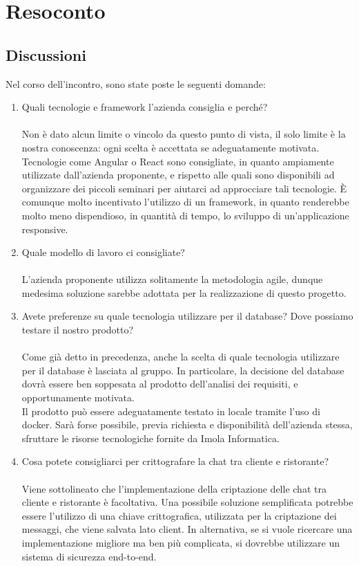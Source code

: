 \documentclass[12pt]{article}
\begin{document}
\section{Resoconto} \label{sec:resoconto}
\subsection{Discussioni} \label{subsec:resdiscussione}
Nel corso dell'incontro, sono state poste le seguenti domande:
\begin{enumerate}
    \item Quali tecnologie e framework l’azienda consiglia e perché?\\ \\
Non è dato alcun limite o vincolo da questo punto di vista, il solo limite è la nostra conoscenza: ogni scelta è accettata se adeguatamente motivata. Tecnologie come Angular o React sono consigliate, in quanto ampiamente utilizzate dall'azienda proponente, e rispetto alle quali sono disponibili ad organizzare dei piccoli seminari per aiutarci ad approcciare tali tecnologie. È comunque molto incentivato l'utilizzo di un framework, in quanto renderebbe molto meno dispendioso, in quantità di tempo, lo sviluppo di un'applicazione responsive.
    \item Quale modello di lavoro ci consigliate? \\ \\
L'azienda proponente utilizza solitamente la metodologia agile, dunque medesima soluzione sarebbe adottata per la realizzazione di questo progetto.
    \item Avete preferenze su quale tecnologia utilizzare per il database? Dove possiamo testare il nostro prodotto?\\ \\
Come già detto in precedenza, anche la scelta di quale tecnologia utilizzare per il database è lasciata al gruppo. In particolare, la decisione del database dovrà essere ben soppesata al prodotto dell'analisi dei requisiti, e opportunamente motivata.\\
Il prodotto può essere adeguatamente testato in locale tramite l'uso di docker. Sarà forse possibile, previa richiesta e disponibilità dell'azienda stessa, sfruttare le risorse tecnologiche fornite da Imola Informatica.
    \item Cosa potete consigliarci per crittografare la chat tra cliente e ristorante?\\ \\
Viene sottolineato che l'implementazione della criptazione delle chat tra cliente e ristorante è facoltativa. Una possibile soluzione semplificata potrebbe essere l'utilizzo di una chiave crittografica, utilizzata per la criptazione dei messaggi, che viene salvata lato client. In alternativa, se si vuole ricercare una implementazione migliore ma ben più complicata, si dovrebbe utilizzare un sistema di sicurezza end-to-end.

\end{enumerate}
\end{document}

